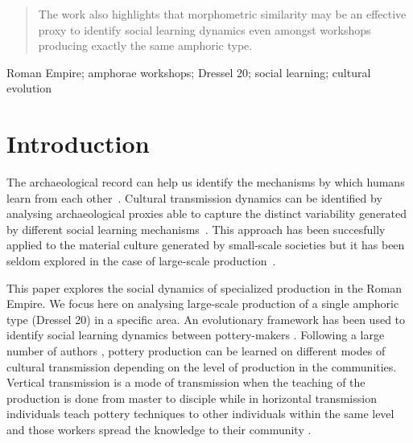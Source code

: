 \documentclass[review]{elsarticle}
\begin{document}
\begin{frontmatter}
\begin{abstract}
The work also highlights that morphometric similarity may be an effective proxy to identify social learning dynamics even amongst workshops producing exactly the same amphoric type. 

\end{abstract}

\begin{keyword}
Roman Empire; amphorae workshops; Dressel 20; social learning; cultural evolution
\end{keyword}

\end{frontmatter}

\linenumbers


\section{Introduction}

The archaeological record can help us identify the mechanisms by which humans learn from each other~\citep{richerson2005not,schillinger_copying_2016}. Cultural transmission dynamics can be identified by analysing archaeological proxies able to capture the distinct variability generated by different social learning mechanisms~\citep{shennan_ceramic_2001,eerkens_jelmer_cultural_2005}. This approach has been succesfully applied to the material culture generated by small-scale societies but it has been seldom explored in the case of large-scale production~\citep{shennan_isolation-by-distance_2015,neff1992ceramics}.

This paper explores the social dynamics of specialized production in the Roman Empire. We focus here on analysing large-scale production of a single amphoric type (Dressel 20) in a specific area. An evolutionary framework has been used to identify social learning dynamics between pottery-makers \citep{mesoudi_cultural_2015, shennan_evolution_2008}. Following a large number of authors \citep{cavalli-sforza_cultural_1981, hosfield_modes_2009}, pottery production can be learned on different modes of cultural transmission depending on the level of production in the communities. Vertical transmission is a mode of transmission when the teaching of the production is done from master to disciple while in horizontal transmission individuals teach pottery techniques to other individuals within the same level and those workers spread the knowledge to their community \citep{epstein_craft_1998}.

\end{document}
